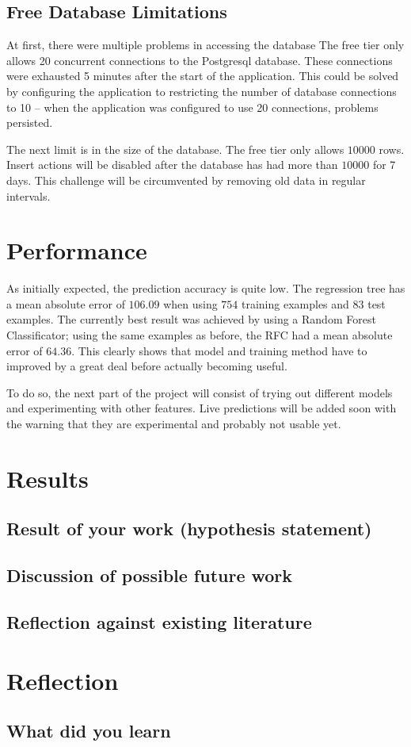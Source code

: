 \documentclass[journal,10pt]{IEEEtran}
\begin{document}
\subsection{Free Database Limitations}
At first, there were multiple problems in accessing the database The free tier only allows 20 concurrent connections to the Postgresql database. These connections were exhausted 5 minutes after the start of the application. This could be solved by configuring the application to restricting the number of database connections to 10 -- when the application was configured to use 20 connections, problems persisted.

The next limit is in the size of the database. The free tier only allows \(10000\) rows. Insert actions will be disabled after the database has had more than \(10000\) for 7 days. This challenge will be circumvented by removing old data in regular intervals.



\section{Performance}
As initially expected, the prediction accuracy is quite low. The regression tree has a mean absolute error of \(106.09\) when using \(754\) training examples and \(83\) test examples. The currently best result was achieved by using a Random Forest Classificator; using the same examples as before, the RFC had a mean absolute error of \(64.36\). This clearly shows that model and training method have to improved by a great deal before actually becoming useful. 

To do so, the next part of the project will consist of trying out different models and experimenting with other features. Live predictions will be added soon with the warning that they are experimental and probably not usable yet.



%
%

\section{Results}

\subsection{Result of your work (hypothesis statement)}

\subsection{Discussion of possible future work}

\subsection{Reflection against existing literature}



\section{Reflection}

\subsection{What did you learn}


  

\end{document}
